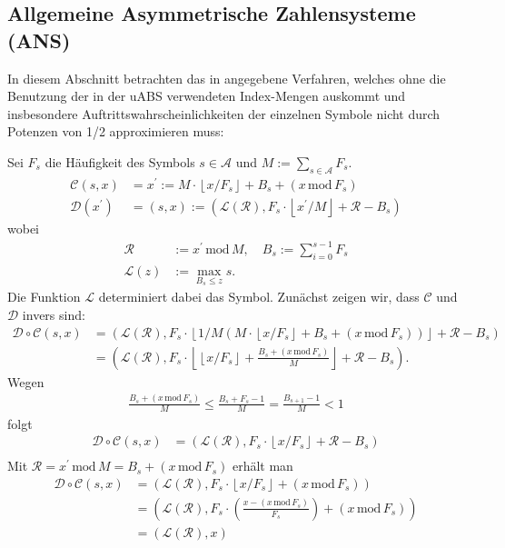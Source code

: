 \documentclass[a4paper,12pt]{article}
\newcommand{\R}{\mathcal R}
\newcommand{\A}{\mathcal A}
\newcommand{\C}{\mathcal C}
\newcommand{\D}{\mathcal D}
\newcommand{\xL}{\mathcal L}
\begin{document}
\subsection{Allgemeine Asymmetrische Zahlensysteme (ANS)}
In diesem Abschnitt betrachten das in \cite{Krajcevski} angegebene Verfahren, welches ohne die Benutzung der in der uABS verwendeten Index-Mengen auskommt und insbesondere Auftrittswahrscheinlichkeiten der einzelnen Symbole nicht durch Potenzen von 1/2 approximieren muss:
\par
Sei $F_{s}$ die Häufigkeit des Symbols $s\in\A$ und $M:=\sum_{s\in\A}F_{s}$.
\begin{align*}
\C(s,x)&= x^{'} := M \cdot \left\lfloor x / F_{s}  \right\rfloor + B_{s} + \left(x\,\text{mod}\,F_{s}\right)
\\
\D(x^{'}) &=(s, x):=\left(\xL(\R),   F_{s}\cdot\left\lfloor x^{'} / M \right\rfloor    + \R - B_{s}\right)
\end{align*} 
wobei
\begin{align*}
\R &:= x^{'}\,\text{mod}\,M, \quad B_{s}:=\sum_{i=0}^{s-1} F_{s}
\\
\xL(z)&:= \max_{B_{s} \leq z} s .
\end{align*}
Die Funktion $\xL$ determiniert dabei das Symbol.
Zunächst zeigen wir, dass $\C$ und $\D$ invers sind:
\begin{align*}
\D \circ \C(s, x)&=\left(\xL(\R),F_{s}\cdot \left\lfloor   1 / M \left( 
M\cdot \left\lfloor  x / F_{s}\right\rfloor  + B_{s}   +  \left(x\,\text{mod}\,F_{s}\right)
\right)  \right\rfloor    + \R - B_{s}\right)
\\
&=
\left(\xL(\R),F_{s}\cdot \left\lfloor 
\left\lfloor  x / F_{s}\right\rfloor  + \frac{B_{s}   +  \left(x\,\text{mod}\,F_{s}\right)}{M}
\right\rfloor  + \R - B_{s} \right).
\end{align*}
Wegen 
\begin{align*}
\frac{B_{s}   +  \left(x\,\text{mod}\,F_{s}\right)}{M} \leq \frac{B_{s}   +  F_{s}-1}{M} = \frac{B_{s+1}-1}{M} < 1
\end{align*}
folgt
\begin{align*}
\D \circ \C(s, x)&=
\left(\xL(\R),F_{s}\cdot
\left\lfloor  x / F_{s}\right\rfloor  + \R - B_{s} \right)
\\
\end{align*}
Mit $\R = x^{'}\,\text{mod}\,M = B_{s} + \left(x\,\text{mod}\,F_{s}\right)$
erhält man
\begin{align*}
\D \circ \C(s, x)&=
\left(\xL(\R),F_{s}\cdot
\left\lfloor  x / F_{s}\right\rfloor  + \left(x\,\text{mod}\,F_{s}\right) \right)
\\
&=
\left(\xL(\R),F_{s}\cdot
\left(\frac{x - \left(x\,\text{mod}\,F_{s}\right)}{F_{s}}\right) + \left(x\,\text{mod}\,F_{s}\right) \right)
\\
&=\left(\xL(\R),x\right)
\end{align*}
\end{document}

